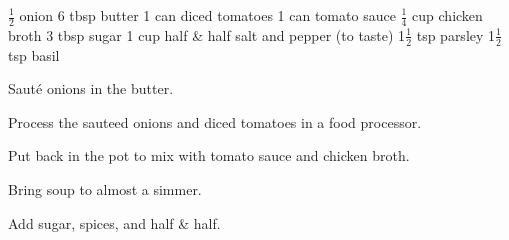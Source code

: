 \dishtype{\soup}
\dishother{}
\begin{ingreds}
    $\frac{1}{2}$ onion
    6 tbsp butter
    1 can diced tomatoes
    1 can tomato sauce
    $\frac{1}{4}$ cup chicken broth
    3 tbsp sugar
    1 cup half \& half
    salt and pepper (to taste)
    1$\frac{1}{2}$ tsp parsley
    1$\frac{1}{2}$ tsp basil    
\end{ingreds}
\begin{method}
    Saut\'e onions in the butter.\par
    Process the sauteed onions and diced tomatoes in a food processor.\par
    Put back in the pot to mix with tomato sauce and chicken broth.\par
    Bring soup to almost a simmer.\par
    Add sugar, spices, and half \& half.
\end{method}